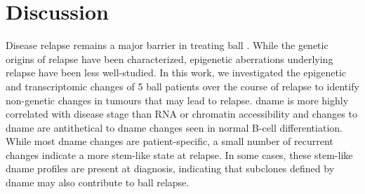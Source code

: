 \section{Discussion}

Disease relapse remains a major barrier in treating \gls{ball} \cite{formanMythSecondRemission2013,liewOutcomesAdultPatients2012,hungerAcuteLymphoblasticLeukemia2015}.
While the genetic origins of relapse have been characterized, epigenetic aberrations underlying relapse have been less well-studied.
In this work, we investigated the epigenetic and transcriptomic changes of 5 \gls{ball} patients over the course of relapse to identify non-genetic changes in tumours that may lead to relapse.
\gls{dname} is more highly correlated with disease stage than RNA or chromatin accessibility and changes to \gls{dname} are antithetical to \gls{dname} changes seen in normal B-cell differentiation.
While most \gls{dname} changes are patient-specific, a small number of recurrent changes indicate a more stem-like state at relapse.
In some cases, these stem-like \gls{dname} profiles are present at diagnosis, indicating that subclones defined by \gls{dname} may also contribute to \gls{ball} relapse.

